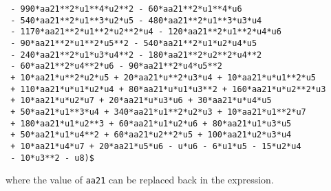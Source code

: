 \begin{verbatim}
 - 990*aa21**2*u1**4*u2**2 - 60*aa21**2*u1**4*u6
 - 540*aa21**2*u1**3*u2*u5 - 480*aa21**2*u1**3*u3*u4
 - 1170*aa21**2*u1**2*u2**2*u4 - 120*aa21**2*u1**2*u4*u6
 - 90*aa21**2*u1**2*u5**2 - 540*aa21**2*u1*u2*u4*u5
 - 240*aa21**2*u1*u3*u4**2 - 180*aa21**2*u2**2*u4**2
 - 60*aa21**2*u4**2*u6 - 90*aa21**2*u4*u5**2
 + 10*aa21*u**2*u2*u5 + 20*aa21*u**2*u3*u4 + 10*aa21*u*u1**2*u5
 + 110*aa21*u*u1*u2*u4 + 80*aa21*u*u1*u3**2 + 160*aa21*u*u2**2*u3
 + 10*aa21*u*u2*u7 + 20*aa21*u*u3*u6 + 30*aa21*u*u4*u5
 + 50*aa21*u1**3*u4 + 340*aa21*u1**2*u2*u3 + 10*aa21*u1**2*u7
 + 180*aa21*u1*u2**3 + 60*aa21*u1*u2*u6 + 80*aa21*u1*u3*u5
 + 50*aa21*u1*u4**2 + 60*aa21*u2**2*u5 + 100*aa21*u2*u3*u4
 + 10*aa21*u4*u7 + 20*aa21*u5*u6 - u*u6 - 6*u1*u5 - 15*u2*u4
 - 10*u3**2 - u8)$
\end{verbatim}
where the value of \texttt{aa21} can be replaced back in the expression.

